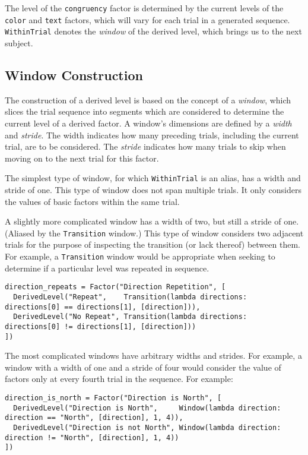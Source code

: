 The level of the \texttt{congruency} factor is determined by the current levels of the \texttt{color} and \texttt{text} factors, which will vary for each trial in a generated sequence. \texttt{WithinTrial} denotes the \textit{window} of the derived level, which brings us to the next subject.

\subsection{Window Construction}

The construction of a derived level is based on the concept of a \textit{window}, which slices the trial sequence into segments which are considered to determine the current level of a derived factor. A window's dimensions are defined by a \textit{width} and \textit{stride}. The width indicates how many preceding trials, including the current trial, are to be considered. The \textit{stride} indicates how many trials to skip when moving on to the next trial for this factor.

The simplest type of window, for which \texttt{WithinTrial} is an alias, has a width and stride of one. This type of window does not span multiple trials. It only considers the values of basic factors within the same trial.

A slightly more complicated window has a width of two, but still a stride of one. (Aliased by the \texttt{Transition} window.) This type of window considers two adjacent trials for the purpose of inspecting the transition (or lack thereof) between them. For example, a \texttt{Transition} window would be appropriate when seeking to determine if a particular level was repeated in sequence.

\begin{verbatim}
direction_repeats = Factor("Direction Repetition", [
  DerivedLevel("Repeat",    Transition(lambda directions: directions[0] == directions[1], [direction])),
  DerivedLevel("No Repeat", Transition(lambda directions: directions[0] != directions[1], [direction]))
])
\end{verbatim}

The most complicated windows have arbitrary widths and strides. For example, a window with a width of one and a stride of four would consider the value of factors only at every fourth trial in the sequence. For example:

\begin{verbatim}
direction_is_north = Factor("Direction is North", [
  DerivedLevel("Direction is North",     Window(lambda direction: direction == "North", [direction], 1, 4)),
  DerivedLevel("Direction is not North", Window(lambda direction: direction != "North", [direction], 1, 4))
])
\end{verbatim}

